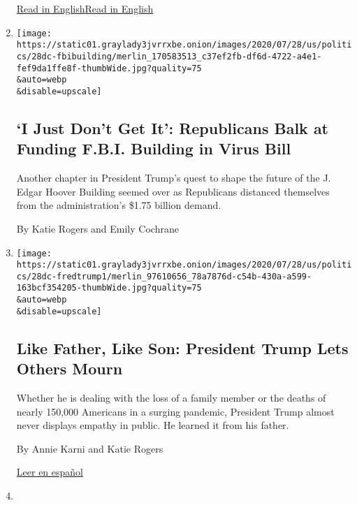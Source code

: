 \begin{enumerate}
  \href{https://www.nytimes3xbfgragh.onion/2020/07/28/us/politics/donald-fred-trump.html}{Read
  in
  English}\href{https://www.nytimes3xbfgragh.onion/2020/07/28/us/politics/donald-fred-trump.html}{Read
  in English}
\item
  \href{/2020/07/28/us/politics/republicans-trump-fbi-building-virus-relief-bill.html}{}

  \texttt{[image: https://static01.graylady3jvrrxbe.onion/images/2020/07/28/us/politics/28dc-fbibuilding/merlin\_170583513\_c37ef2fb-df6d-4722-a4e1-fef9da1ffe8f-thumbWide.jpg?quality=75\\\&auto=webp\\\&disable=upscale]}

  \hypertarget{i-just-dont-get-it-republicans-balk-at-funding-fbi-building-in-virus-bill}{%
  \subsection{`I Just Don't Get It': Republicans Balk at Funding F.B.I.
  Building in Virus
  Bill}\label{i-just-dont-get-it-republicans-balk-at-funding-fbi-building-in-virus-bill}}

  Another chapter in President Trump's quest to shape the future of the
  J. Edgar Hoover Building seemed over as Republicans distanced
  themselves from the administration's \$1.75 billion demand.

  By Katie Rogers and Emily Cochrane
\item
  \href{/2020/07/28/us/politics/donald-fred-trump.html}{}

  \texttt{[image: https://static01.graylady3jvrrxbe.onion/images/2020/07/28/us/politics/28dc-fredtrump1/merlin\_97610656\_78a7876d-c54b-430a-a599-163bcf354205-thumbWide.jpg?quality=75\\\&auto=webp\\\&disable=upscale]}

  \hypertarget{like-father-like-son-president-trump-lets-others-mourn}{%
  \subsection{Like Father, Like Son: President Trump Lets Others
  Mourn}\label{like-father-like-son-president-trump-lets-others-mourn}}

  Whether he is dealing with the loss of a family member or the deaths
  of nearly 150,000 Americans in a surging pandemic, President Trump
  almost never displays empathy in public. He learned it from his
  father.

  By Annie Karni and Katie Rogers

  \href{https://www.nytimes3xbfgragh.onion/es/2020/07/31/espanol/estados-unidos/fred-trump-donald-trump.html}{Leer
  en español}
\item
  \href{/2020/07/27/us/politics/trump-yankees-fauci.html}{}


\end{enumerate}
